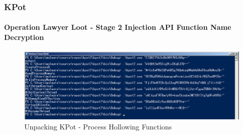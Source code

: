 \documentclass[aspectratio=169]{beamer}
\begin{document}
{
\begin{frame}
  \frametitle{KPot}
  \framesubtitle{Operation Lawyer Loot - Stage 2 Injection API Function Name Decryption}
  \begin{center}
    \begin{figure}
      \includegraphics[width=14cm]{kpot-unpacking-10}
      \caption{Unpacking KPot - Process Hollowing Functions}
    \end{figure}
  \end{center}
\end{frame}
}
\end{document}

